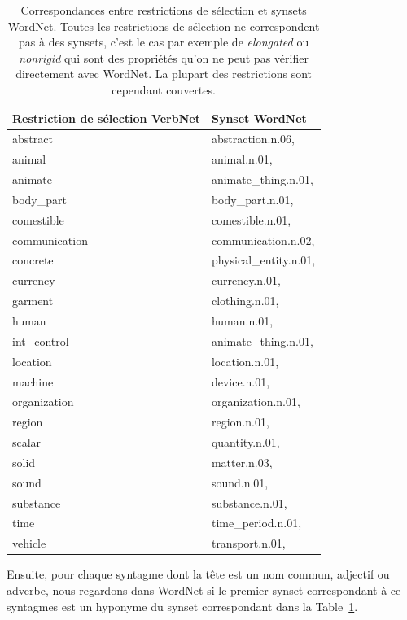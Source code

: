 \begin{table}[ht]
\centering
\begin{tabular}{ll}
    \toprule
        Restriction de sélection VerbNet & Synset WordNet \\
    \midrule
        abstract & abstraction.n.06, \\
        animal & animal.n.01, \\
        animate & animate\_thing.n.01, \\
        body\_part & body\_part.n.01, \\
        comestible & comestible.n.01, \\
        communication & communication.n.02, \\
        concrete & physical\_entity.n.01, \\
        currency & currency.n.01, \\
        garment & clothing.n.01, \\
        human & human.n.01, \\
        int\_control & animate\_thing.n.01, \\
        location & location.n.01, \\
        machine & device.n.01, \\
        organization & organization.n.01, \\
        region & region.n.01, \\
        scalar & quantity.n.01, \\
        solid & matter.n.03, \\
        sound & sound.n.01, \\
        substance & substance.n.01, \\
        time & time\_period.n.01, \\
        vehicle & transport.n.01, \\
  \bottomrule
\end{tabular}

\caption{\label{table:mapping_verbnetrestr_wordnet}Correspondances entre
restrictions de sélection et synsets WordNet. Toutes les restrictions de
sélection ne correspondent pas à des synsets, c'est le cas par exemple de
\textit{elongated} ou \textit{nonrigid} qui sont des propriétés qu'on ne peut pas
vérifier directement avec WordNet. La plupart des restrictions sont cependant
couvertes.}
\end{table}

Ensuite, pour chaque syntagme dont la tête est un nom commun, adjectif ou
adverbe, nous regardons dans WordNet si le premier synset correspondant à ce
syntagmes est un hyponyme du synset correspondant dans la
Table~\ref{table:mapping_verbnetrestr_wordnet}.

